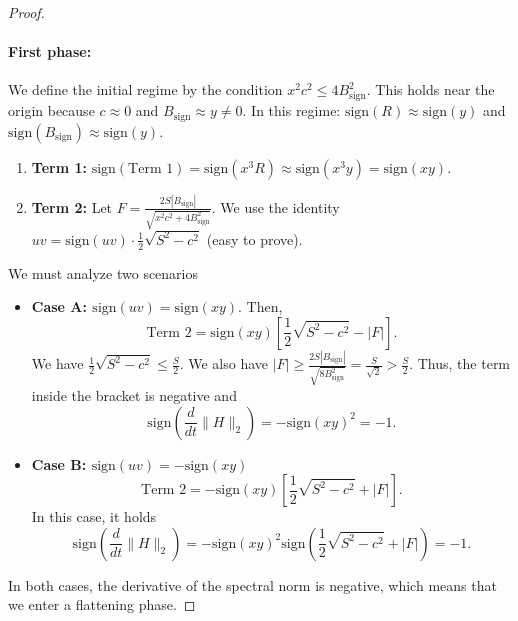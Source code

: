 \documentclass[a4paper,11pt]{article}
\newcommand{\1}{\mathbbm{1}}
\theoremstyle{plain}
\begin{document}
\begin{proof}
\paragraph{First phase:}
We define the initial regime by the condition $x^2c^2 \le 4B_{\text{sign}}^2$. This holds near the origin because $c \approx 0$ and $B_{\text{sign}} \approx y \neq 0$. In this regime: $\text{sign}(R) \approx \text{sign}(y)$ and $\text{sign}(B_{\text{sign}}) \approx \text{sign}(y)$.
\begin{enumerate}
    \item \textbf{Term 1:} $\text{sign}(\text{Term 1}) = \text{sign}(x^3 R) \approx \text{sign}(x^3 y) = \text{sign}(xy)$.
    \item \textbf{Term 2:} Let $F = \frac{2 S |B_{\text{sign}}|}{\sqrt{x^2c^2 + 4B_{\text{sign}}^2}}$.
    We use the identity $uv = \text{sign}(uv) \cdot \frac{1}{2}\sqrt{S^2 - c^2}$ (easy to prove).
\end{enumerate}

We must analyze two scenarios
\begin{itemize}
    \item \textbf{Case A: $\text{sign}(uv) = \text{sign}(xy)$}. Then,
    $$
    \text{Term 2} = \text{sign}(xy) \left[ \frac{1}{2}\sqrt{S^2 - c^2} - |F| \right].
    $$
    We have $\frac{1}{2}\sqrt{S^2 - c^2} \leq \frac{S}{2}$. We also have
    $|F| \geq \frac{2 S |B_{\text{sign}}|}{\sqrt{8B_{\text{sign}}^2}} = \frac{S}{\sqrt{2}} > \frac{S}{2}$. Thus, the term inside the bracket is negative and 
    \begin{equation*}
        \text{sign}\left(\frac{d}{dt} \|H\|_2\right) = -\text{sign}(xy)^2 = -1.
    \end{equation*}
    
    \item \textbf{Case B: $\text{sign}(uv) = -\text{sign}(xy)$}
    $$
    \text{Term 2} = -\text{sign}(xy) \left[ \frac{1}{2}\sqrt{S^2 - c^2} + |F| \right].
    $$
In this case, it holds
\begin{equation*}
   \text{sign}\left(\frac{d}{dt} \|H\|_2\right) = -\text{sign}(xy)^2 \text{sign}\left(\frac{1}{2}\sqrt{S^2 - c^2} + |F|\right) = -1.
\end{equation*}
    
    
\end{itemize}
In both cases, the derivative of the spectral norm is negative, which means that we enter a flattening phase.





\end{proof}
\end{document}
